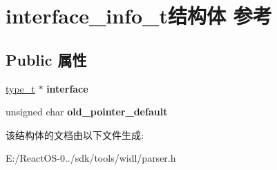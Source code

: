 \hypertarget{structinterface__info__t}{}\section{interface\+\_\+info\+\_\+t结构体 参考}
\label{structinterface__info__t}
\subsection*{Public 属性}
\begin{DoxyCompactItemize}
\item 
\mbox{\label{structinterface__info__t_a09068c557535a514398a1e1156739e33}} 
\hyperlink{struct__type__t}{type\+\_\+t} $\ast$ {\bfseries interface}
\item 
\mbox{\label{structinterface__info__t_a92c80e13866c05b25df6a7d8f11cd6f2}} 
unsigned char {\bfseries old\+\_\+pointer\+\_\+default}
\end{DoxyCompactItemize}


该结构体的文档由以下文件生成\+:\begin{DoxyCompactItemize}
\item 
E\+:/\+React\+O\+S-\/0../sdk/tools/widl/parser.\+h\end{DoxyCompactItemize}
